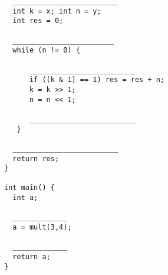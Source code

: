\documentclass[12pt]{exam}
\begin{document}
\begin{questions}
\begin{verbatim}
  _________________________
  int k = x; int n = y;
  int res = 0;

  ________________________
  while (n != 0) {

      _________________________
      if ((k & 1) == 1) res = res + n;
      k = k >> 1;
      n = n << 1;

      _________________________
   }

  _________________________
  return res;
}

int main() {
  int a;

  _____________
  a = mult(3,4);

  _____________
  return a;
}
\end{verbatim}

\end{questions}
\end{document}
